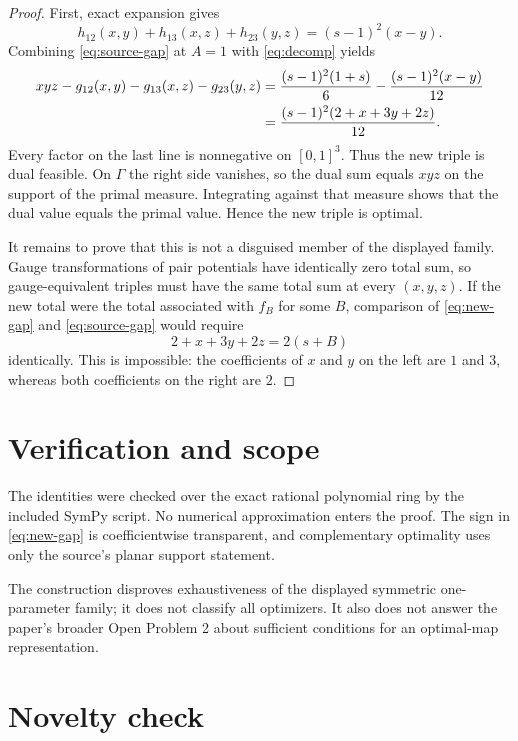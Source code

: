 \documentclass[11pt]{article}
\begin{document}
\begin{proof}
First, exact expansion gives
\begin{equation}\label{eq:decomp}
 h_{12}(x,y)+h_{13}(x,z)+h_{23}(y,z)
 =(s-1)^2(x-y).
\end{equation}
Combining \eqref{eq:source-gap} at $A=1$ with \eqref{eq:decomp} yields
\begin{align}
 xyz-g_{12}(x,y)-g_{13}(x,z)-g_{23}(y,z)
 &=\frac{(s-1)^2(1+s)}6-\frac{(s-1)^2(x-y)}{12}\notag\\
 &=\frac{(s-1)^2(2+x+3y+2z)}{12}.\label{eq:new-gap}
\end{align}
Every factor on the last line is nonnegative on $[0,1]^3$. Thus the new
triple is dual feasible. On $\Gamma$ the right side vanishes, so the dual sum
equals $xyz$ on the support of the primal measure. Integrating against that
measure shows that the dual value equals the primal value. Hence the new
triple is optimal.

It remains to prove that this is not a disguised member of the displayed
family. Gauge transformations of pair potentials have identically zero total
sum, so gauge-equivalent triples must have the same total sum at every
$(x,y,z)$. If the new total were the total associated with $f_B$ for some
$B$, comparison of \eqref{eq:new-gap} and \eqref{eq:source-gap} would require
\[
 2+x+3y+2z=2(s+B)
\]
identically. This is impossible: the coefficients of $x$ and $y$ on the left
are $1$ and $3$, whereas both coefficients on the right are $2$.
\end{proof}

\section{Verification and scope}

The identities were checked over the exact rational polynomial ring by the
included SymPy script. No numerical approximation enters the proof. The sign
in \eqref{eq:new-gap} is coefficientwise transparent, and complementary
optimality uses only the source's planar support statement.

The construction disproves exhaustiveness of the displayed symmetric
one-parameter family; it does not classify all optimizers. It also does not
answer the paper's broader Open Problem 2 about sufficient conditions for an
optimal-map representation.

\section{Novelty check}
\end{document}
